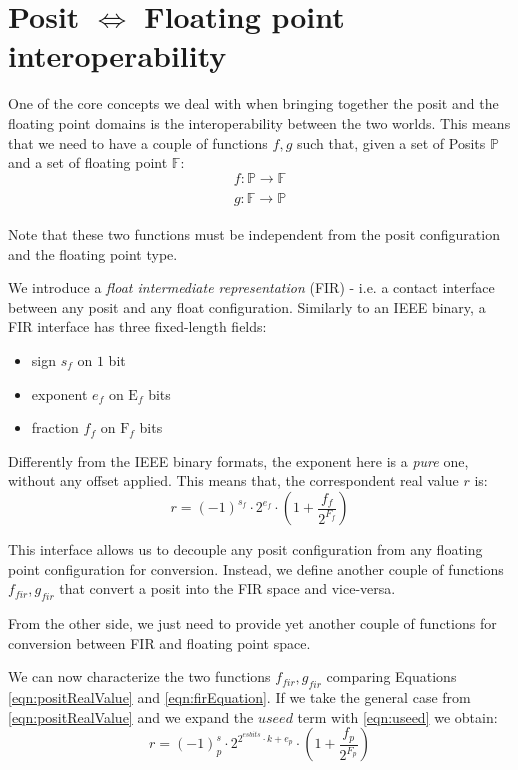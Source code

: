 \section{Posit $\Leftrightarrow$ Floating point  interoperability}\label{sec:fir}

One of the core concepts we deal with when bringing together the posit and the floating point domains is the interoperability between the two worlds. This means that we need to have a couple of functions $f,g$ such that, given a set of Posits $\mathbb{P}$ and a set of floating point $\mathbb{F}$:
\begin{equation}
    f: \mathbb{P} \xrightarrow[]{} \mathbb{F}
\end{equation}
\begin{equation}
    g: \mathbb{F} \xrightarrow[]{} \mathbb{P}
\end{equation}

Note that these two functions must be independent from the posit configuration  and the floating point type.

We introduce a \textit{float intermediate representation} (FIR) - i.e. a contact interface between any posit and any float configuration. Similarly to an IEEE binary, a FIR interface has three fixed-length fields:
\begin{itemize}
    \item sign $s_f$ on $1$ bit
    \item exponent $e_f$ on $\text{E}_f$ bits
    \item fraction $f_f$ on $\text{F}_f$ bits
\end{itemize}

Differently from the IEEE binary formats, the exponent here is a \textit{pure} one, without any offset applied. This means that, the correspondent real value $r$ is:
\begin{equation}\label{eqn:firEquation}
    r = (-1)^{s_f} \cdot 2^{e_f} \cdot \left(1 + \frac{f_f}{2^{F_f}} \right)
\end{equation}

This interface allows us to decouple any posit configuration from any floating point configuration for conversion. Instead, we define another couple of functions $f_{fir}, 
g_{fir}$ that convert a posit into the FIR space and vice-versa.

From the other side, we just need to provide yet another couple of functions for conversion between FIR and floating point space.

We can now characterize the two functions $f_{fir}, g_{fir}$ comparing Equations \eqref{eqn:positRealValue} and \eqref{eqn:firEquation}. If we take the general case from \eqref{eqn:positRealValue} and we expand the $useed$ term with \eqref{eqn:useed} we obtain:
\begin{equation}\label{eqn:positRealExpanded}
    r = (-1)^s_p \cdot 2^{2^{esbits} \cdot k + e_p} \cdot \left ( 1+ \frac{f_p}{2^{F_p}} \right)
\end{equation}

